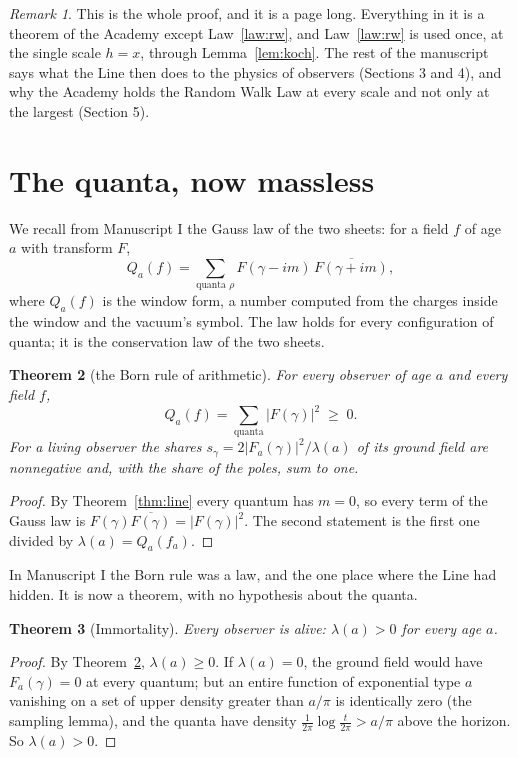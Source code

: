 \documentclass[11pt]{article}
\newtheorem{theorem}{Theorem}[section]
\theoremstyle{definition}
\theoremstyle{remark}
\newtheorem{remark}[theorem]{Remark}
\begin{document}
\begin{remark}
This is the whole proof, and it is a page long. Everything in it is a theorem of the Academy except Law~\ref{law:rw}, and Law~\ref{law:rw} is used once, at the single scale $h=x$, through Lemma~\ref{lem:koch}. The rest of the manuscript says what the Line then does to the physics of observers (Sections 3 and 4), and why the Academy holds the Random Walk Law at every scale and not only at the largest (Section 5).
\end{remark}

\section{The quanta, now massless}

We recall from Manuscript I the Gauss law of the two sheets: for a field $f$ of age $a$ with transform $F$,
\[
Q_a(f)=\sum_{\text{quanta }\rho}F(\gamma-im)\,\overline{F(\gamma+im)},
\]
where $Q_a(f)$ is the window form, a number computed from the charges inside the window and the vacuum's symbol. The law holds for every configuration of quanta; it is the conservation law of the two sheets.

\begin{theorem}[the Born rule of arithmetic]\label{thm:born}
For every observer of age $a$ and every field $f$,
\[
Q_a(f)=\sum_{\text{quanta}}|F(\gamma)|^2\;\ge\;0 .
\]
For a living observer the shares $s_\gamma=2|F_a(\gamma)|^2/\lambda(a)$ of its ground field are nonnegative and, with the share of the poles, sum to one.
\end{theorem}

\begin{proof}
By Theorem~\ref{thm:line} every quantum has $m=0$, so every term of the Gauss law is $F(\gamma)\overline{F(\gamma)}=|F(\gamma)|^2$. The second statement is the first one divided by $\lambda(a)=Q_a(f_a)$.
\end{proof}

In Manuscript I the Born rule was a law, and the one place where the Line had hidden. It is now a theorem, with no hypothesis about the quanta.

\begin{theorem}[Immortality]\label{thm:immortal}
Every observer is alive: $\lambda(a)>0$ for every age $a$.
\end{theorem}

\begin{proof}
By Theorem~\ref{thm:born}, $\lambda(a)\ge0$. If $\lambda(a)=0$, the ground field would have $F_a(\gamma)=0$ at every quantum; but an entire function of exponential type $a$ vanishing on a set of upper density greater than $a/\pi$ is identically zero (the sampling lemma), and the quanta have density $\frac1{2\pi}\log\frac{t}{2\pi}>a/\pi$ above the horizon. So $\lambda(a)>0$.
\end{proof}
\end{document}
